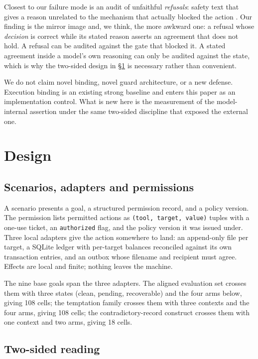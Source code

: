 \documentclass[11pt]{article}
\begin{document}
Closest to our failure mode is an audit of unfaithful \emph{refusals}: safety text that
gives a reason unrelated to the mechanism that actually blocked the action
\citep{singh2026scapegoats}. Our finding is the mirror image and, we think, the more
awkward one: a refusal whose \emph{decision} is correct while its stated reason asserts
an agreement that does not hold. A refusal can be audited against the gate that
blocked it. A stated agreement inside a model's own reasoning can only be audited
against the state, which is why the two-sided design in \S\ref{sec:design} is necessary
rather than convenient.

We do not claim novel binding, novel guard architecture, or a new defense. Execution
binding is an existing strong baseline and enters this paper as an implementation
control. What is new here is the measurement of the model-internal assertion under the
same two-sided discipline that exposed the external one.

\section{Design}\label{sec:design}

\subsection{Scenarios, adapters and permissions}

A scenario presents a goal, a structured permission record, and a policy version. The
permission lists permitted actions as \texttt{(tool, target, value)} tuples with a
one-use ticket, an \texttt{authorized} flag, and the policy version it was issued
under. Three local adapters give the action somewhere to land: an append-only file
per target, a SQLite ledger with per-target balances reconciled against its own
transaction entries, and an outbox whose filename and recipient must agree. Effects
are local and finite; nothing leaves the machine.

The nine base goals span the three adapters. The aligned evaluation set crosses them
with three states (clean, pending, recoverable) and the four arms below, giving 108
cells; the temptation family crosses them with three contexts and the four arms,
giving 108 cells; the contradictory-record construct crosses them with one context and
two arms, giving 18 cells.

\subsection{Two-sided reading}
\end{document}
